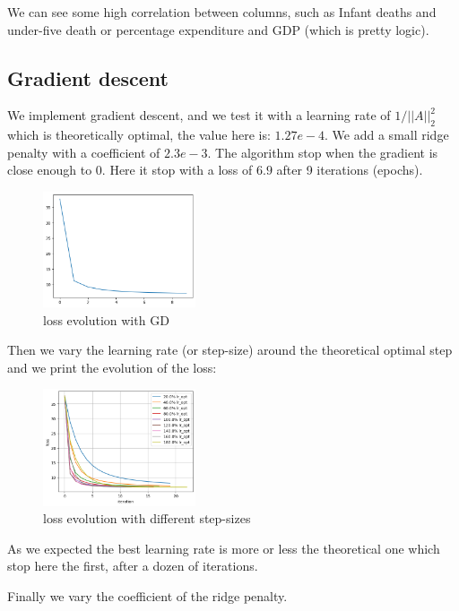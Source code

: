 \documentclass{article}
\begin{document}
    We can see some high correlation between columns, such as Infant deaths and under-five death or percentage expenditure and GDP (which is pretty logic).

\subsection{Gradient descent}
    We implement gradient descent, and we test it with a learning rate of $1/||A||_{2}^2$ which is theoretically optimal, the value here is: $1.27e-4$. We add a small ridge penalty with a coefficient of $2.3e-3$. The algorithm stop when the gradient is close enough to 0. Here it stop with a loss of $6.9$ after 9 iterations (epochs).

    \begin{figure}[!h]
    \centering
    \includegraphics[width=0.4\textwidth]{images/loss1.png}
    \caption{loss evolution with GD}
    \label{fig:loss1}
    \end{figure}

    Then we vary the learning rate (or step-size) around the theoretical optimal step and we print the evolution of the loss:

     \begin{figure}[!h]
    \centering
    \includegraphics[width=0.4\textwidth]{images/loss2.png}
    \caption{loss evolution with different step-sizes}
    \label{fig:loss2}
    \end{figure}   

    As we expected the best learning rate is more or less the theoretical one which stop here the first, after a dozen of iterations.

    Finally we vary the coefficient of the ridge penalty. 
    
\end{document}
